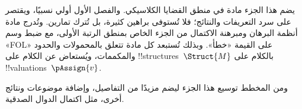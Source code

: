 \documentclass[../../include/open-logic-part]{subfiles}
\begin{document}

\begin{editorial}
  يضم هذا الجزء مادة في منطق القضايا الكلاسيكي. والفصل الأول أولي
  نسبيًا، ويقتصر على سرد التعريفات والنتائج؛ فلا تُستوفى براهين كثيرة،
  بل تُترك تمارين. وتُدرج مادة أنظمة البرهان ومبرهنة الاكتمال من الجزء
  الخاص بمنطق الرتبة الأولى، مع ضبط وسم «FOL» على القيمة «خطأ». وبذلك
  تُستبعد كل مادة تتعلق بالمحمولات والحدود والمكممات، ويُستعاض عن
  الكلام على !!{structure}s~$\Struct{M}$ بالكلام على
  !!{valuation}s~$\pAssign{v}$.

  ومن المخطط توسيع هذا الجزء ليضم مزيدًا من التفاصيل، وإضافة موضوعات
  ونتائج أخرى، مثل اكتمال الدوال الصدقية.
\end{editorial}










\OLEndPartHook
\end{document}
